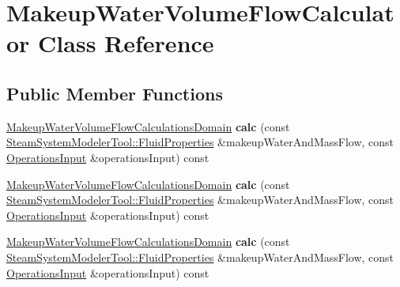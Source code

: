 \hypertarget{class_makeup_water_volume_flow_calculator}{}\section{Makeup\+Water\+Volume\+Flow\+Calculator Class Reference}
\label{class_makeup_water_volume_flow_calculator}
\subsection*{Public Member Functions}
\begin{DoxyCompactItemize}
\item 
\mbox{\label{class_makeup_water_volume_flow_calculator_a7f8f91cb8788f4b392e2b655a593fa47}} 
\hyperlink{class_makeup_water_volume_flow_calculations_domain}{Makeup\+Water\+Volume\+Flow\+Calculations\+Domain} {\bfseries calc} (const \hyperlink{struct_steam_system_modeler_tool_1_1_fluid_properties}{Steam\+System\+Modeler\+Tool\+::\+Fluid\+Properties} \&makeup\+Water\+And\+Mass\+Flow, const \hyperlink{class_operations_input}{Operations\+Input} \&operations\+Input) const
\item 
\mbox{\label{class_makeup_water_volume_flow_calculator_a7f8f91cb8788f4b392e2b655a593fa47}} 
\hyperlink{class_makeup_water_volume_flow_calculations_domain}{Makeup\+Water\+Volume\+Flow\+Calculations\+Domain} {\bfseries calc} (const \hyperlink{struct_steam_system_modeler_tool_1_1_fluid_properties}{Steam\+System\+Modeler\+Tool\+::\+Fluid\+Properties} \&makeup\+Water\+And\+Mass\+Flow, const \hyperlink{class_operations_input}{Operations\+Input} \&operations\+Input) const
\item 
\mbox{\label{class_makeup_water_volume_flow_calculator_a7f8f91cb8788f4b392e2b655a593fa47}} 
\hyperlink{class_makeup_water_volume_flow_calculations_domain}{Makeup\+Water\+Volume\+Flow\+Calculations\+Domain} {\bfseries calc} (const \hyperlink{struct_steam_system_modeler_tool_1_1_fluid_properties}{Steam\+System\+Modeler\+Tool\+::\+Fluid\+Properties} \&makeup\+Water\+And\+Mass\+Flow, const \hyperlink{class_operations_input}{Operations\+Input} \&operations\+Input) const
\end{DoxyCompactItemize}


